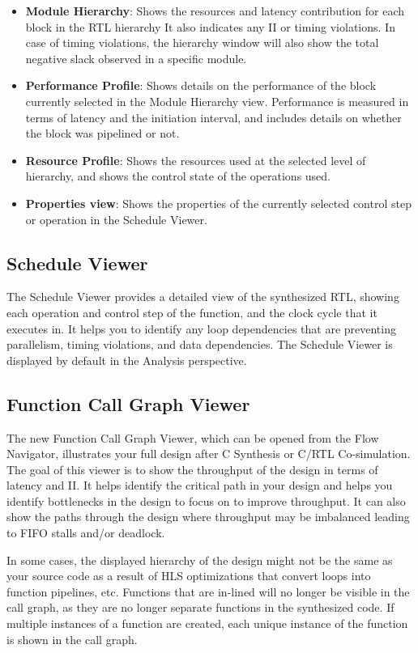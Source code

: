 \begin{itemize}
  \item \textbf{Module Hierarchy}: Shows the resources and latency contribution for each block in the RTL hierarchy It also indicates any II or timing violations. In case of timing violations, the hierarchy
  window will also show the total negative slack observed in a specific module.
  \item \textbf{Performance Profile}: Shows details on the performance of the block currently selected in the Module Hierarchy view. Performance is measured in terms of latency and the initiation interval, and includes details on whether the block was pipelined or not.
  \item \textbf{Resource Profile}: Shows the resources used at the selected level of hierarchy, and shows the control state of the operations used.
  \item \textbf{Properties view}: Shows the properties of the currently selected control step or operation in the Schedule Viewer. 
\end{itemize}

\subsection{Schedule Viewer}
The Schedule Viewer provides a detailed view of the synthesized RTL, showing each operation and control step of the function, and the clock cycle that it executes in. It helps you to identify any loop dependencies that are preventing parallelism, timing violations, and data dependencies. The Schedule Viewer is displayed by default in the Analysis perspective.

\subsection{Function Call Graph Viewer}
The new Function Call Graph Viewer, which can be opened from the Flow Navigator, illustrates your full design after C Synthesis or C/RTL Co-simulation. The goal of this viewer is to show the throughput of the design in terms of latency and II. It helps identify the critical path in your design and helps you identify bottlenecks in the design to focus on to improve throughput. It can also show the paths through the design where throughput may be imbalanced leading to FIFO stalls and/or deadlock.

\par In some cases, the displayed hierarchy of the design might not be the same as your source code
as a result of HLS optimizations that convert loops into function pipelines, etc. Functions that are
in-lined will no longer be visible in the call graph, as they are no longer separate functions in the
synthesized code. If multiple instances of a function are created, each unique instance of the function is shown in the call graph. 

